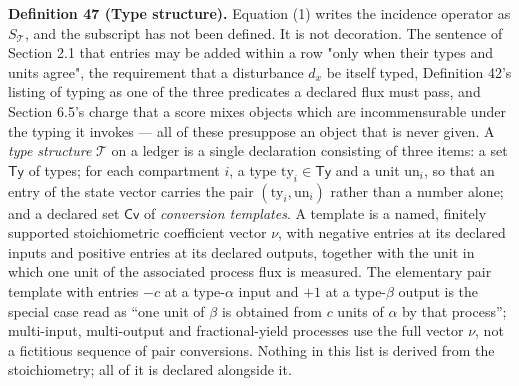 \documentclass[11pt]{article}
\begin{document}
\textbf{Definition 47 (Type structure).} Equation (1) writes the incidence operator as \(S_{\mathcal{T}}\), and the subscript has not been defined. It is not decoration. The sentence of Section 2.1 that entries may be added within a row "only when their types and units agree", the requirement that a disturbance \(d_x\) be itself typed, Definition 42's listing of typing as one of the three predicates a declared flux must pass, and Section 6.5's charge that a score mixes objects which are incommensurable under the typing it invokes --- all of these presuppose an object that is never given. A \emph{type structure} \(\mathcal{T}\) on a ledger is a single declaration consisting of three items: a set \(\mathsf{Ty}\) of types; for each compartment \(i\), a type \(\mathrm{ty}_i \in \mathsf{Ty}\) and a unit \(\mathrm{un}_i\), so that an entry of the state vector carries the pair \((\mathrm{ty}_i,\allowbreak{} \mathrm{un}_i)\) rather than a number alone; and a declared set \(\mathsf{Cv}\) of \emph{conversion templates}. A template is a named, finitely supported stoichiometric coefficient vector \(\nu\), with negative entries at its declared inputs and positive entries at its declared outputs, together with the unit in which one unit of the associated process flux is measured. The elementary pair template with entries \(-c\) at a type-\(\alpha\) input and \(+1\) at a type-\(\beta\) output is the special case read as ``one unit of \(\beta\) is obtained from \(c\) units of \(\alpha\) by that process''; multi-input, multi-output and fractional-yield processes use the full vector \(\nu\), not a fictitious sequence of pair conversions. Nothing in this list is derived from the stoichiometry; all of it is declared alongside it.
\end{document}
